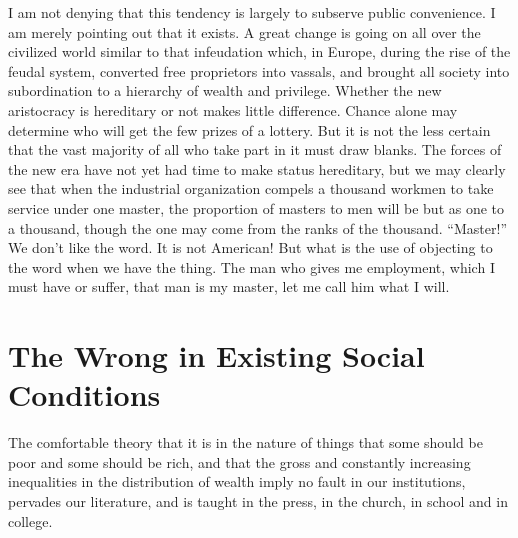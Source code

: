 \documentclass{book}
\begin{document}
I am not denying that this tendency is largely to subserve public convenience. I am merely pointing out that it exists. A great change is going on all over the civilized world similar to that infeudation which, in Europe, during the rise of the feudal system, converted free proprietors into vassals, and brought all society into subordination to a hierarchy of wealth and privilege. Whether the new aristocracy is hereditary or not makes little difference. Chance alone may determine who will get the few prizes of a lottery. But it is not the less certain that the vast majority of all who take part in it must draw blanks. The forces of the new era have not yet had time to make status hereditary, but we may clearly see that when the industrial organization compels a thousand workmen to take service under one master, the proportion of masters to men will be but as one to a thousand, though the one may come from the ranks of the thousand. “Master!” We don’t like the word. It is not American! But what is the use of objecting to the word when we have the thing. The man who gives me employment, which I must have or suffer, that man is my master, let me call him what I will.



\chapter{The Wrong in Existing Social Conditions}
\label{chapter-6}
The comfortable theory that it is in the nature of things that some should be poor and some should be rich, and that the gross and constantly increasing inequalities in the distribution of wealth imply no fault in our institutions, pervades our literature, and is taught in the press, in the church, in school and in college.
\end{document}
